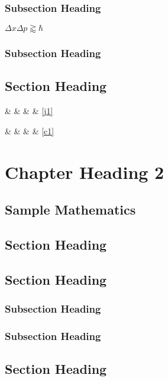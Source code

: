 \documentclass[dissertation,math,vertlayout]{aaltoseries}
\begin{document}
\subsection{Subsection Heading}
$\Delta x\Delta p \gtrapprox \hbar$
\lipsum[7-8]
\subsection{Subsection Heading}
\lipsum[9-10]
\section{Section Heading}
\lipsum[11-12]


 \&  \&  \& \pageref{j1} \& \ref{j1}

 \&  \&   \& \pageref{c1} \& \ref{c1} 


\chapter{Chapter Heading 2}
\section{Sample Mathematics}
%
\section{Section Heading}
\lipsum[1-4]
\section{Section Heading}
\lipsum[5-6]
\subsection{Subsection Heading}
\lipsum[7-8]
\subsection{Subsection Heading}
\lipsum[9-10]
\section{Section Heading}
\lipsum[11-12]
\end{document}

